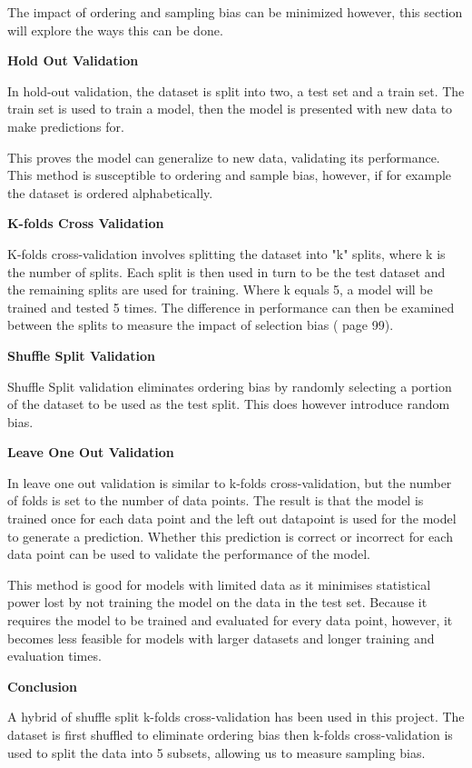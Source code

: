 The impact of ordering and sampling bias can be minimized however, this section will explore the ways this can be done.

\textbf{Hold Out Validation}

In hold-out validation, the dataset is split into two, a test set and a train set. The train set is used to train a model, then the model is presented with new data to make predictions for. 

This proves the model can generalize to new data, validating its performance. This method is susceptible to ordering and sample bias, however, if for example the dataset is ordered alphabetically.

\textbf{K-folds Cross Validation}

K-folds cross-validation involves splitting the dataset into "k" splits, where k is the number of splits. Each split is then used in turn to be the test dataset and the remaining splits are used for training. Where k equals 5, a model will be trained and tested 5 times. The difference in performance can then be examined between the splits to measure the impact of selection bias (\cite{Aurélien2017} page 99).

\textbf{Shuffle Split Validation}

Shuffle Split validation eliminates ordering bias by randomly selecting a portion of the dataset to be used as the test split. This does however introduce random bias.

\textbf{Leave One Out Validation}

In leave one out validation is similar to k-folds cross-validation, but the number of folds is set to the number of data points. The result is that the model is trained once for each data point and the left out datapoint is used for the model to generate a prediction. Whether this prediction is correct or incorrect for each data point can be used to validate the performance of the model.

This method is good for models with limited data as it minimises statistical power lost by not training the model on the data in the test set. Because it requires the model to be trained and evaluated for every data point, however, it becomes less feasible for models with larger datasets and longer training and evaluation times.

\textbf{Conclusion}

A hybrid of shuffle split k-folds cross-validation has been used in this project. The dataset is first shuffled to eliminate ordering bias then k-folds cross-validation is used to split the data into 5 subsets, allowing us to measure sampling bias.


